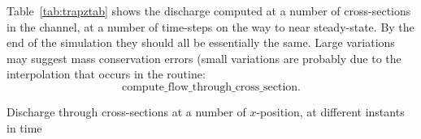 Table~\ref{tab:trapztab} shows the discharge computed at a number of cross-sections in the channel, at a number of time-steps on the way to near steady-state. By the end of the simulation they should all be essentially the same. Large variations may suggest mass conservation errors (small variations are probably due to the interpolation that occurs in the routine:
\begin{equation*}
\textrm{compute\_flow\_through\_cross\_section}.
\end{equation*}


\begin{table}
\caption{Discharge through cross-sections at a number of $x$-position, at different instants in time}
\label{tab:trapztab}
\end{table}

\endinput
